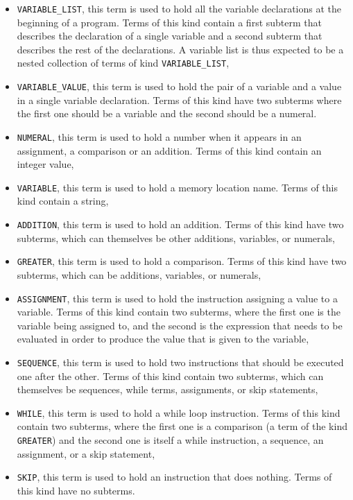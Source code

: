\documentclass{book}
\begin{document}
\begin{itemize}
  \item {\tt VARIABLE\_LIST}, this term is used to hold all the variable
   declarations at the beginning of a program.  Terms of this kind contain
   a first subterm that describes the declaration of a single variable and
   a second subterm that describes the rest of the declarations.  A variable
   list is thus expected to be a nested collection of terms of kind
   {\tt VARIABLE\_LIST},
  \item {\tt VARIABLE\_VALUE}, this term is used to hold the pair of a variable
   and a value in a single variable declaration.  Terms of this kind have
   two subterms where the first one should be a variable and the second
   should be a numeral.
  \item {\tt NUMERAL}, this term is used to hold a number when it appears
   in an assignment, a comparison or an addition.  Terms of this kind
   contain an integer value,
  \item {\tt VARIABLE}, this term is used to hold a memory location name.
   Terms of this kind contain a string,
  \item {\tt ADDITION}, this term is used to hold an addition.  Terms of
   this kind have two subterms, which can themselves be other additions,
   variables, or numerals,
  \item {\tt GREATER}, this term is used to hold a comparison.  Terms
   of this kind have two subterms, which can be additions, variables, or
   numerals,
  \item {\tt ASSIGNMENT}, this term is used to hold the instruction
   assigning a value to a variable.  Terms of this kind contain two
   subterms, where the first one is the variable being assigned to, and
   the second is the expression that needs to be evaluated in order to
   produce the value that is given to the variable,
  \item {\tt SEQUENCE}, this term is used to hold two instructions that
   should be executed one after the other.  Terms of this kind contain
   two subterms, which can themselves be sequences, while terms, 
   assignments, or skip statements,
  \item {\tt WHILE}, this term is used to hold a while loop instruction.
   Terms of this kind contain two subterms, where the first one is
   a comparison (a term of the kind {\tt GREATER}) and the second one
   is itself a while instruction, a sequence, an assignment, or a skip
   statement,
  \item {\tt SKIP}, this term is used to hold an instruction that does
   nothing.  Terms of this kind have no subterms.
\end{itemize}
\end{document}
